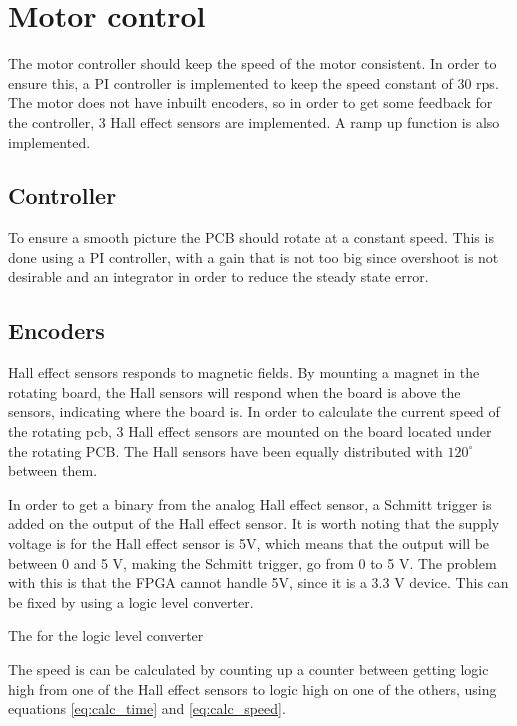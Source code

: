 \section{Motor control}
The motor controller should keep the speed of the motor consistent.
In order to ensure this, a PI controller is implemented to keep the speed constant of 30 rps.
The motor does not have inbuilt encoders, so in order to get some feedback for the controller, 3 Hall effect sensors are implemented.
A ramp up function is also implemented.

\subsection{Controller}

To ensure a smooth picture the PCB should rotate at a constant speed.
This is done using a PI controller, with a gain that is not too big since overshoot is not desirable and an integrator in order to reduce the steady state error.

\subsection{Encoders} \label{sec:encoders}

Hall effect sensors responds to magnetic fields.
By mounting a magnet in the rotating board, the Hall sensors will respond when the board is above the sensors, indicating where the board is.
In order to calculate the current speed of the rotating pcb, 3 Hall effect sensors are mounted on the board located under the rotating PCB.
The Hall sensors have been equally distributed with $120^{\circ}$ between them.

In order to get a binary from the analog Hall effect sensor, a Schmitt trigger\cite[p. 655]{book:prac_ele} is added on the output of the Hall effect sensor.
It is worth noting that the supply voltage is for the Hall effect sensor is 5V, which means that the output will be between 0 and 5 V, making the Schmitt trigger, go from 0 to 5 V.
The problem with this is that the FPGA cannot handle 5V, since it is a 3.3 V device.
This can be fixed by using a logic level converter. 

The for the logic level converter 

The speed is can be calculated by counting up a counter between getting logic high from one of the Hall effect sensors to  logic high on one of the others, using equations  \ref{eq:calc_time} and \ref{eq:calc_speed}.

